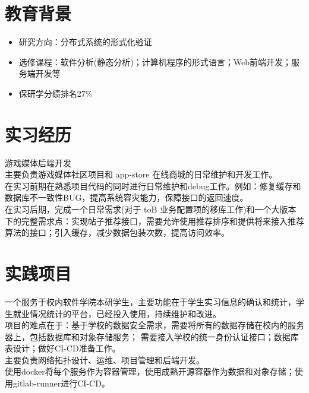 \documentclass{resume}
\begin{document}

\sepspace
{}

\section{教育背景}
\begin{itemize}
    \item 研究方向：分布式系统的形式化验证
\end{itemize}
\begin{itemize}
    \item 选修课程：软件分析(静态分析)；计算机程序的形式语言；Web前端开发；服务端开发等
    \item 保研学分绩排名27\%
\end{itemize}
\sepspace

\section{实习经历}
\Content
{{游戏媒体后端开发}}
{
    {\\主要负责游戏媒体社区项目和 app-store 在线商城的日常维护和开发工作。}
    {\\在实习前期在熟悉项目代码的同时进行日常维护和debug工作。例如：修复缓存和数据库不一致性BUG，提高系统容灾能力，保障接口的返回速度。}
    {\\在实习后期，完成一个日常需求(对于 toB 业务配置项的移库工作)和一个大版本下的完整需求点：实现帖子推荐接口，需要允许使用推荐排序和提供将来接入推荐算法的接口；引入缓存，减少数据包装次数，提高访问效率。}
}
\sepspace

\section{实践项目}
\Contents
{一个服务于校内软件学院本研学生，主要功能在于学生实习信息的确认和统计，学生就业情况统计的平台，已经投入使用，持续维护和改进。}
{\\
项目的难点在于：基于学校的数据安全需求，需要将所有的数据存储在校内的服务器上，包括数据库和对象存储服务；
需要接入学校的统一身份认证接口；数据库表设计；做好CI-CD准备工作。
\\主要负责网络拓扑设计、运维、项目管理和后端开发。\\使用docker将每个服务作为容器管理，使用成熟开源容器作为数据和对象存储；使用gitlab-runner进行CI-CD。 }
\end{document}
